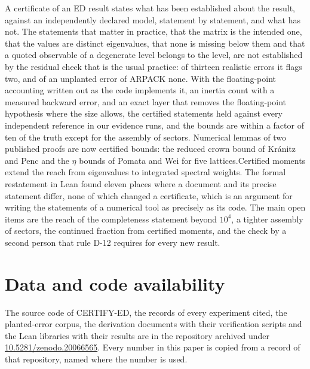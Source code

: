 \documentclass[11pt,a4paper]{article}
\newif\ifshowSone
\begin{document}
A certificate of an ED result states what has been established about the result, against an independently declared
model, statement by statement, and what has not. The statements that matter in practice, that the matrix is the
intended one, that the values are distinct eigenvalues, that none is missing below them and that a quoted observable
of a degenerate level belongs to the level, are not established by the residual check that is the usual practice:
of thirteen realistic errors it flags two, and of an unplanted error of ARPACK none. With the floating-point
accounting written out as the code implements it, an inertia count with a measured backward error, and an exact layer
that removes the floating-point hypothesis where the size allows, the certified statements held against every
independent reference in our evidence runs, and the bounds are within a factor of ten of the truth except for the
assembly of sectors. Numerical lemmas of two published proofs are now certified bounds: the reduced crown bound of
Kr\'anitz and Penc and the $\eta$ bounds of Pomata and Wei for five lattices.\ifshowSone{} The same instrument found
that the published spin-1 crown value is not a lower bound at its printed couplings, because a configuration outside
the published search lies lower, an omission that no check of the reported sectors alone can reveal.\fi Certified moments extend the reach from
eigenvalues to integrated spectral weights. The formal restatement in Lean found eleven places where a document and
its precise statement differ, none of which changed a certificate, which is an argument for writing the statements of
a numerical tool as precisely as its code. The main open items are the reach of the completeness statement beyond
$10^4$, a tighter assembly of sectors, the continued fraction from certified moments, and the check by a second person
that rule D-12 requires for every new result.

\section*{Data and code availability}
The source code of CERTIFY-ED, the records of every experiment cited, the planted-error corpus, the derivation
documents with their verification scripts and the Lean libraries with their results are in the repository archived
under \href{https://doi.org/10.5281/zenodo.20066565}{10.5281/zenodo.20066565}. Every number in this paper is copied
from a record of that repository, named where the number is used.



\end{document}
